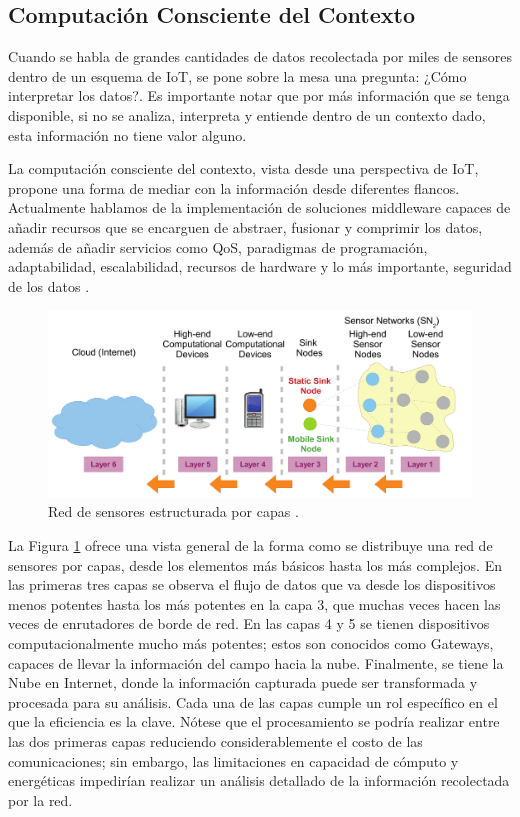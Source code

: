 \subsection{Computación Consciente del Contexto}

Cuando se habla de grandes cantidades de datos recolectada por miles de sensores dentro de un esquema de IoT, se pone sobre la mesa una pregunta: ¿Cómo interpretar los datos?. Es importante notar que por más información que se tenga disponible, si no se analiza, interpreta y entiende dentro de un contexto dado, esta información no tiene valor alguno.

La computación consciente del contexto, vista desde una perspectiva de IoT, propone una forma de mediar con la información desde diferentes flancos. Actualmente hablamos de la implementación de soluciones middleware capaces de añadir recursos que se encarguen de abstraer, fusionar y comprimir los datos, además de añadir servicios como QoS, paradigmas de programación, adaptabilidad, escalabilidad, recursos de hardware y lo más importante, seguridad de los datos \citep{molla2006survey}.

\begin{figure}[!ht]
	\centering
		\includegraphics[scale=0.85]{Figures/Structure_of_a_sensor_network}
	\caption{Red de sensores estructurada por capas \citep{perera2014context}.}
	\label{fig:IoTWSN2Cloud}
\end{figure}

La Figura \ref{fig:IoTWSN2Cloud} ofrece una vista general de la forma como se distribuye una red de sensores por capas, desde los elementos más básicos hasta los más complejos. En las primeras tres capas se observa el flujo de datos que va desde los dispositivos menos potentes hasta los más potentes en la capa 3, que muchas veces hacen las veces de enrutadores de borde de red. En las capas 4 y 5 se tienen dispositivos computacionalmente mucho más potentes; estos son conocidos como Gateways, capaces de llevar la información del campo hacia la nube. Finalmente, se tiene la Nube en Internet, donde la información capturada puede ser transformada y procesada para su análisis. Cada una de las capas cumple un rol específico en el que la eficiencia es la clave\citep{sho2008ttcg}. Nótese que el procesamiento se podría realizar entre las dos primeras capas reduciendo considerablemente el costo de las comunicaciones; sin embargo, las limitaciones en capacidad de cómputo y energéticas impedirían realizar un análisis detallado de la información recolectada por la red.

